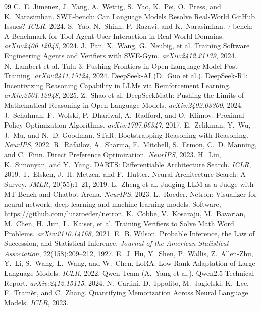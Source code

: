\documentclass{article}
\begin{document}
\begin{thebibliography}{99}
 C.~E. Jimenez, J.~Yang, A.~Wettig, S.~Yao, K.~Pei, O.~Press, and K.~Narasimhan. SWE-bench: Can Language Models Resolve Real-World GitHub Issues? \emph{ICLR}, 2024.
 S.~Yao, N.~Shinn, P.~Razavi, and K.~Narasimhan. $\tau$-bench: A Benchmark for Tool-Agent-User Interaction in Real-World Domains. \emph{arXiv:2406.12045}, 2024.
 J.~Pan, X.~Wang, G.~Neubig, et al. Training Software Engineering Agents and Verifiers with SWE-Gym. \emph{arXiv:2412.21139}, 2024.
 N.~Lambert et al. Tulu 3: Pushing Frontiers in Open Language Model Post-Training. \emph{arXiv:2411.15124}, 2024.
 DeepSeek-AI (D.~Guo et al.). DeepSeek-R1: Incentivizing Reasoning Capability in LLMs via Reinforcement Learning. \emph{arXiv:2501.12948}, 2025.
 Z.~Shao et al. DeepSeekMath: Pushing the Limits of Mathematical Reasoning in Open Language Models. \emph{arXiv:2402.03300}, 2024.
 J.~Schulman, F.~Wolski, P.~Dhariwal, A.~Radford, and O.~Klimov. Proximal Policy Optimization Algorithms. \emph{arXiv:1707.06347}, 2017.
 E.~Zelikman, Y.~Wu, J.~Mu, and N.~D. Goodman. STaR: Bootstrapping Reasoning with Reasoning. \emph{NeurIPS}, 2022.
 R.~Rafailov, A.~Sharma, E.~Mitchell, S.~Ermon, C.~D. Manning, and C.~Finn. Direct Preference Optimization. \emph{NeurIPS}, 2023.
 H.~Liu, K.~Simonyan, and Y.~Yang. DARTS: Differentiable Architecture Search. \emph{ICLR}, 2019.
 T.~Elsken, J.~H. Metzen, and F.~Hutter. Neural Architecture Search: A Survey. \emph{JMLR}, 20(55):1--21, 2019.
 L.~Zheng et al. Judging LLM-as-a-Judge with MT-Bench and Chatbot Arena. \emph{NeurIPS}, 2023.
 L.~Roeder. Netron: Visualizer for neural network, deep learning and machine learning models. Software, \url{https://github.com/lutzroeder/netron}.
 K.~Cobbe, V.~Kosaraju, M.~Bavarian, M.~Chen, H.~Jun, L.~Kaiser, et al. Training Verifiers to Solve Math Word Problems. \emph{arXiv:2110.14168}, 2021.
 E.~B. Wilson. Probable Inference, the Law of Succession, and Statistical Inference. \emph{Journal of the American Statistical Association}, 22(158):209--212, 1927.
 E.~J. Hu, Y.~Shen, P.~Wallis, Z.~Allen-Zhu, Y.~Li, S.~Wang, L.~Wang, and W.~Chen. LoRA: Low-Rank Adaptation of Large Language Models. \emph{ICLR}, 2022.
 Qwen Team (A.~Yang et al.). Qwen2.5 Technical Report. \emph{arXiv:2412.15115}, 2024.
 N.~Carlini, D.~Ippolito, M.~Jagielski, K.~Lee, F.~Tram\`er, and C.~Zhang. Quantifying Memorization Across Neural Language Models. \emph{ICLR}, 2023.

\end{thebibliography}
\end{document}
